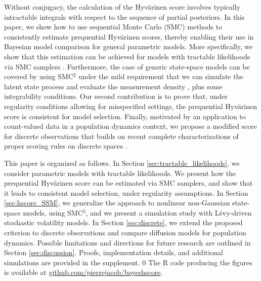 \documentclass[12pt]{article}
\theoremstyle{plain}
\theoremstyle{definition}
\newcommand{\blind}{0}
\begin{document}
	Without conjugacy, the calculation of the Hyv{\"a}rinen score 
	involves typically intractable integrals with respect to the sequence of partial posteriors.
	In this paper, we show how to use sequential Monte Carlo (SMC) methods
	to consistently estimate prequential Hyv{\"a}rinen scores, thereby enabling
	their use in Bayesian model comparison for general 
	parametric models. More specifically, we show that this estimation can be
	achieved for models with tractable likelihoods via SMC samplers
	\citep{chopin:2002,delmoral:doucet:jasra2006,zhou2015towards}. 
	Furthermore, the case of generic state-space models can be covered  
	by using SMC$^2$ \citep{fulop2013efficient,chopin:jacob:papaspiliopoulos2013} under the
	mild requirement that we can simulate the latent state process and evaluate the
	measurement density \citep{breto2009time,andrieu2010}, plus some integrability conditions. 
	Our second contribution is to prove that, under regularity conditions allowing
	for misspecified settings, the prequential Hyv{\"a}rinen score is consistent for model selection. Finally, motivated by an application to count-valued data
	in a population dynamics context, we propose a modified score for discrete observations 
	that builds on recent complete characterizations of proper scoring rules on discrete spaces \citep{McCarthy1956, hendrickson1971,dawid2012,dawid2017note}.
	
	This paper is organized as follows. 
	In Section
	\ref{sec:tractable_likelihoods}, we consider parametric models with tractable likelihoods. We present how the prequential
	Hyv{\"a}rinen score can be estimated via SMC samplers, and show that it leads to consistent model selection, under regularity assumptions.
	In Section \ref{sec:hscore_SSM}, we generalize the approach to nonlinear non-Gaussian state-space models, using SMC$^2$, and we present a simulation study with L\'{e}vy-driven stochastic
	volatility models.
	In Section \ref{sec:discrete}, we extend the proposed criterion to discrete observations and compare diffusion models for population dynamics. Possible limitations and directions for future research are outlined 
	in Section \ref{sec:discussion}. 
	Proofs, implementation details, and additional simulations are provided in the supplement.
	\blind
	{The R code producing the figures is available at \href{https://github.com/pierrejacob/bayeshscore}{github.com/pierrejacob/bayeshscore}.
	}
	\fi
	
	
\end{document}
